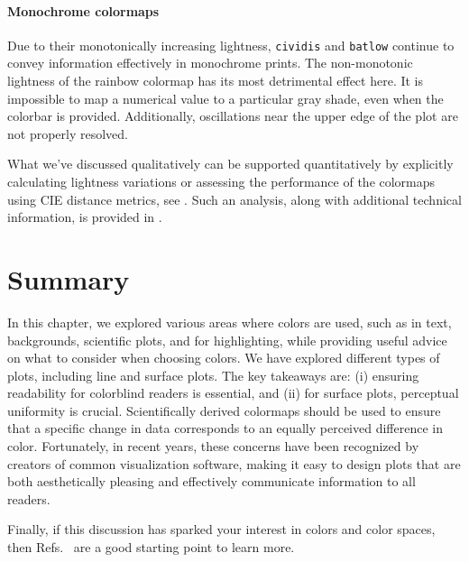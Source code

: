 \paragraph{Monochrome colormaps} Due to their monotonically increasing lightness, \verb|cividis| and \verb|batlow| continue to convey information effectively in monochrome prints. The non-monotonic lightness of the rainbow colormap has its most detrimental effect here. It is impossible to map a numerical value to a particular gray shade, even when the colorbar is provided. Additionally, oscillations near the upper edge of the plot are not properly resolved.

What we've discussed qualitatively can be supported quantitatively by explicitly calculating lightness variations or assessing the performance of the colormaps using CIE distance metrics, see . Such an analysis, along with additional technical information, is provided in .

\section{Summary}
In this chapter, we explored various areas where colors are used, such as in text, backgrounds, scientific plots, and for highlighting, while providing useful advice on what to consider when choosing colors. We have explored different types of plots, including line and surface plots. The key takeaways are: (i) ensuring readability for colorblind readers is essential, and (ii) for surface plots, perceptual uniformity is crucial. Scientifically derived colormaps should be used to ensure that a specific change in data corresponds to an equally perceived difference in color. Fortunately, in recent years, these concerns have been recognized by creators of common visualization software, making it easy to design plots that are both aesthetically pleasing and effectively communicate information to all readers.

Finally, if this discussion has sparked your interest in colors and color spaces, then Refs.~\cite{kovesi2015,moreland2015,moreland2009,crameri2020} are a good starting point to learn more.
